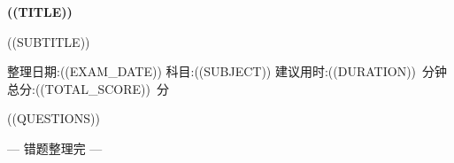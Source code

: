 \documentclass[12pt, a4paper, fontset=none]{ctexart}
\begin{document}
\begin{center}
  {\huge\bfseries ((TITLE))\par}
  \vspace{0.5em}
  {\large ((SUBTITLE))\par}
  \vspace{0.8em}
  {\normalsize 整理日期:((EXAM_DATE)) \qquad 科目:((SUBJECT)) \qquad
   建议用时:((DURATION))~分钟 \qquad 总分:((TOTAL_SCORE))~分\par}
\end{center}

\vspace{0.4em}

\noindent{}

\vspace{1em}

((QUESTIONS))

\vspace{2em}
\begin{center}
  {\small --- 错题整理完 ---}
\end{center}
\end{document}
